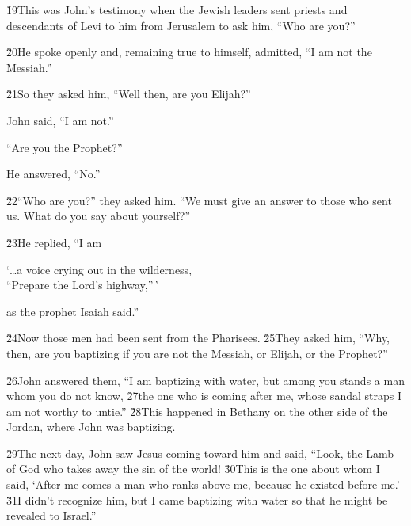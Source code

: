 \v{19}This was John's testimony when the Jewish leaders sent priests and descendants of Levi to him from Jerusalem to ask him, ``Who are you?''

\v{20}He spoke openly and, remaining true to himself, admitted, ``I am not the Messiah.''

\v{21}So they asked him, ``Well then, are you Elijah?''

John said, ``I am not.''

``Are you the Prophet?''

He answered, ``No.''

\v{22}``Who are you?'' they asked him. ``We must give an answer to those who sent us. What do you say about yourself?''

\v{23}He replied, ``I am

\begin{poetry}
\poeml `{\ldots}a voice crying out in the wilderness, \\
\poemll    ``Prepare the Lord's highway,''\,'
\end{poetry}
as the prophet Isaiah said.''

\v{24}Now those men had been sent from the Pharisees. \v{25}They asked him, ``Why, then, are you baptizing if you are not the Messiah, or Elijah, or the Prophet?''

\v{26}John answered them, ``I am baptizing with water, but among you stands a man whom you do not know, \v{27}the one who is coming after me, whose sandal straps I am not worthy to untie.'' \v{28}This happened in Bethany on the other side of the Jordan, where John was baptizing.

\v{29}The next day, John saw Jesus coming toward him and said, ``Look, the Lamb of God who takes away the sin of the world! \v{30}This is the one about whom I said, `After me comes a man who ranks above me, because he existed before me.' \v{31}I didn't recognize him, but I came baptizing with water so that he might be revealed to Israel.''

